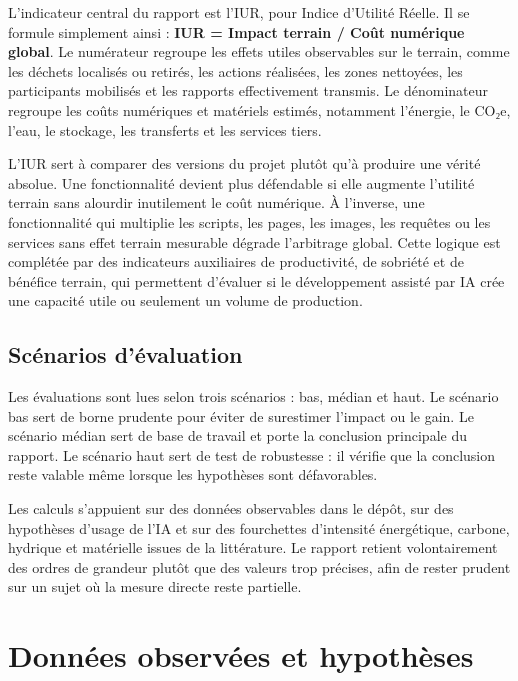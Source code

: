 \documentclass[
  10pt,
  a4paper,
  DIV=11,
  numbers=noendperiod,
  oneside]{scrreprt}
\let\oldtextbf\textbf
\renewcommand{\textbf}[1]{\oldtextbf{\textcolor{cmmnavy}{#1}}}
\begin{document}
L'indicateur central du rapport est l'IUR, pour Indice d'Utilité Réelle.
Il se formule simplement ainsi : \textbf{IUR = Impact terrain / Coût
numérique global}. Le numérateur regroupe les effets utiles observables
sur le terrain, comme les déchets localisés ou retirés, les actions
réalisées, les zones nettoyées, les participants mobilisés et les
rapports effectivement transmis. Le dénominateur regroupe les coûts
numériques et matériels estimés, notamment l'énergie, le CO₂e, l'eau, le
stockage, les transferts et les services tiers.

L'IUR sert à comparer des versions du projet plutôt qu'à produire une
vérité absolue. Une fonctionnalité devient plus défendable si elle
augmente l'utilité terrain sans alourdir inutilement le coût numérique.
À l'inverse, une fonctionnalité qui multiplie les scripts, les pages,
les images, les requêtes ou les services sans effet terrain mesurable
dégrade l'arbitrage global. Cette logique est complétée par des
indicateurs auxiliaires de productivité, de sobriété et de bénéfice
terrain, qui permettent d'évaluer si le développement assisté par IA
crée une capacité utile ou seulement un volume de production.

\subsection{Scénarios d'évaluation}\label{scuxe9narios-duxe9valuation}

Les évaluations sont lues selon trois scénarios : bas, médian et haut.
Le scénario bas sert de borne prudente pour éviter de surestimer
l'impact ou le gain. Le scénario médian sert de base de travail et porte
la conclusion principale du rapport. Le scénario haut sert de test de
robustesse : il vérifie que la conclusion reste valable même lorsque les
hypothèses sont défavorables.

Les calculs s'appuient sur des données observables dans le dépôt, sur
des hypothèses d'usage de l'IA et sur des fourchettes d'intensité
énergétique, carbone, hydrique et matérielle issues de la littérature.
Le rapport retient volontairement des ordres de grandeur plutôt que des
valeurs trop précises, afin de rester prudent sur un sujet où la mesure
directe reste partielle.

\section{Données observées et
hypothèses}\label{donnuxe9es-observuxe9es-et-hypothuxe8ses}
\end{document}
